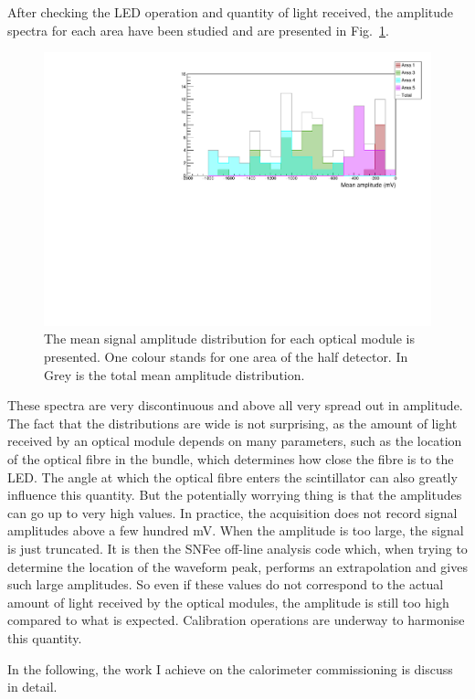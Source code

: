 After checking the LED operation and quantity of light received, the amplitude spectra for each area have been studied and are presented in Fig.~\ref{fig:LI_ampl}.
\begin{figure}[h!]
  \centering
  \includegraphics[width=15cm]{commissioning/fig_commissioning/LI_mean_ampl.pdf}
  \caption{The mean signal amplitude distribution for each optical module is presented.
    One colour stands for one area of the half detector.
    In Grey is the total mean amplitude distribution.
    \label{fig:LI_ampl}}
\end{figure}
These spectra are very discontinuous and above all very spread out in amplitude.
The fact that the distributions are wide is not surprising, as the amount of light received by an optical module depends on many parameters, such as the location of the optical fibre in the bundle, which determines how close the fibre is to the LED.
The angle at which the optical fibre enters the scintillator can also greatly influence this quantity.
But the potentially worrying thing is that the amplitudes can go up to very high values.
In practice, the acquisition does not record signal amplitudes above a few hundred mV.
When the amplitude is too large, the signal is just truncated.
It is then the SNFee off-line analysis code which, when trying to determine the location of the waveform peak, performs an extrapolation and gives such large amplitudes.
So even if these values do not correspond to the actual amount of light received by the optical modules, the amplitude is still too high compared to what is expected.
Calibration operations are underway to harmonise this quantity.

In the following, the work I achieve on the calorimeter commissioning is discuss in detail.


